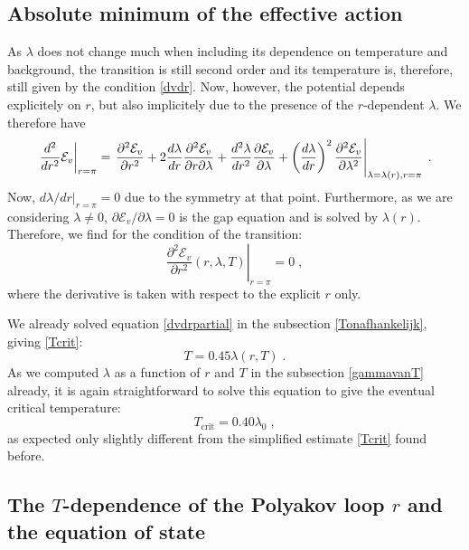 \subsection{Absolute minimum of the effective action}

As $\lambda$ does not change much when including its dependence on
temperature and background, the transition is still second order and its
temperature is, therefore, still given by the condition \eqref{dvdr}. Now,
however, the potential depends explicitely on $r$, but also implicitely due
to the presence of the $r$-dependent $\lambda$. We therefore have
\begin{equation}
\left. \frac{d^2}{dr^2} \mathcal{E}_{v} \right|_{r=\pi} = \left. \frac{%
\partial^2\mathcal{E}_{v}}{\partial r^2} + 2 \frac{d\lambda}{dr} \frac{%
\partial^2\mathcal{E}_{v}}{\partial r\partial\lambda} + \frac{d^2\lambda}{%
dr^2} \frac{\partial \mathcal{E}_{v}}{\partial\lambda} + \left(\frac{d\lambda%
}{dr}\right)^2 \frac{\partial^2\mathcal{E}_{v}}{\partial\lambda^2}%
\right|_{\lambda=\lambda(r),r=\pi} \;.
\end{equation}
Now, $d\lambda/dr|_{r=\pi} = 0$ due to the symmetry at that point.
Furthermore, as we are considering $\lambda\neq0$, $\partial \mathcal{E}_{v}/\partial\lambda = 0$ is the gap
equation and is solved by $\lambda(r)$. Therefore, we find for the condition
of the transition:
\begin{equation}  \label{dvdrpartial}
\left. \frac{\partial^2\mathcal{E}_{v}}{\partial r^2} (r,\lambda,T) \right|_{r=\pi} = 0 \;,
\end{equation}
where the derivative is taken with respect to the explicit $r$ only.

We already solved equation \eqref{dvdrpartial} in the subsection \ref{Tonafhankelijk}, giving
\eqref{Tcrit}:
\begin{equation}
T = 0.45 \lambda(r,T) \;.
\end{equation}
As we computed $\lambda$ as a function of $r$ and $T$ in the subsection \ref{gammavanT}
already, it is again straightforward to solve this equation to give the eventual critical
temperature:
\begin{equation}
T_\text{crit} = \unit{0.40}{\lambda_0} \;,
\end{equation}
as expected only slightly different from the simplified estimate \eqref{Tcrit} found before. %

\subsection{The \texorpdfstring{$T$}{T}-dependence of the Polyakov loop \texorpdfstring{$r$}{r} and the equation of
state}

